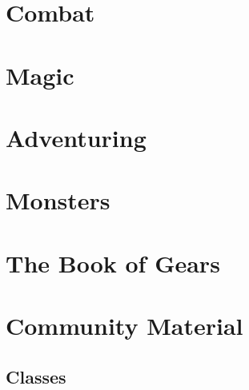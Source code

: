 \documentclass[10pt]{report}
\begin{document}





\chapter{Combat}








\chapter{Magic}









\chapter{Adventuring}









\chapter{Monsters}





\appendix

\chapter{The Book of Gears}


\chapter{Community Material}


\section{Classes}
%

%
%


%
\end{document}
